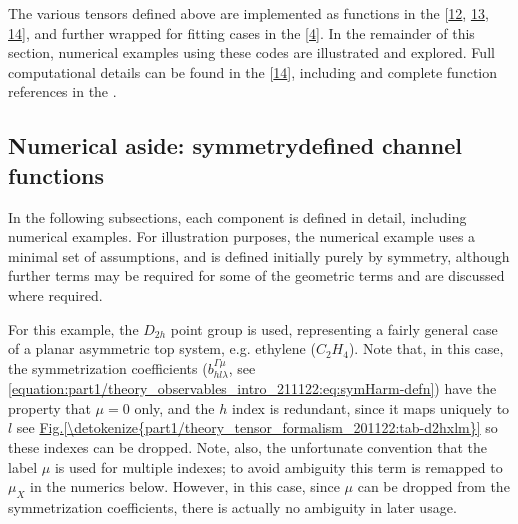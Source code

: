 \documentclass[letterpaper,table,10pt,english]{jupyterBook}
\begin{document}
\sphinxAtStartPar
The various tensors defined above are implemented as functions in the  {[}\hyperlink{cite.backmatter/bibliography:id561}{12}, \hyperlink{cite.backmatter/bibliography:id508}{13}, \hyperlink{cite.backmatter/bibliography:id506}{14}{]}, and further wrapped for fitting cases in the  {[}\hyperlink{cite.backmatter/bibliography:id574}{4}{]}. In the remainder of this section, numerical examples using these codes are illustrated and explored. Full computational details can be found in the  {[}\hyperlink{cite.backmatter/bibliography:id506}{14}{]}, including  and complete function references in the .


\subsection{Numerical aside: symmetry\sphinxhyphen{}defined channel functions}
\label{\detokenize{part1/theory_tensor_formalism_201122:numerical-aside-symmetry-defined-channel-functions}}
\sphinxAtStartPar
In the following sub\sphinxhyphen{}sections, each component is defined in detail, including numerical examples. For illustration purposes, the numerical example uses a minimal set of assumptions, and is defined initially purely by symmetry, although further terms may be required for some of the geometric terms and are discussed where required.

\sphinxAtStartPar
For this example, the \(D_{2h}\) point group is used, representing a fairly general case of a planar asymmetric top system, e.g. ethylene (\(C_2H_4\)). Note that, in this case, the symmetrization coefficients (\(b_{hl\lambda}^{\Gamma\mu}\), see \eqref{equation:part1/theory_observables_intro_211122:eq:symHarm-defn}) have the property that \(\mu=0\) only, and the \(h\) index is redundant, since it maps uniquely to \(l\) \sphinxhyphen{} see \hyperref[\detokenize{part1/theory_tensor_formalism_201122:tab-d2hxlm}]{Fig.\@ \ref{\detokenize{part1/theory_tensor_formalism_201122:tab-d2hxlm}}} \sphinxhyphen{} so these indexes can be dropped. Note, also, the unfortunate convention that the label \(\mu\) is used for multiple indexes; to avoid ambiguity this term is remapped to \(\mu_X\) in the numerics below. However, in this case, since \(\mu\) can be dropped from the symmetrization coefficients, there is actually no ambiguity in later usage.
\end{document}
